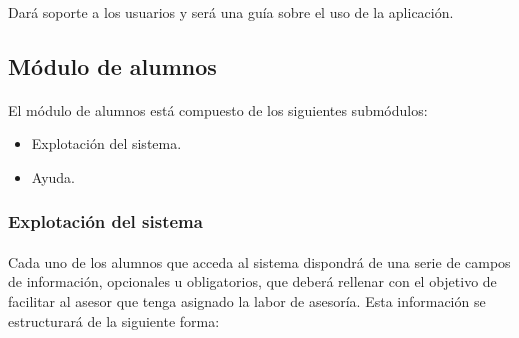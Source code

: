       \paragraph{}Dará soporte a los usuarios y será una guía sobre el uso de
      la aplicación.

   \subsection{Módulo de alumnos}\label{modAlumnos}

      \paragraph{}El módulo de alumnos está compuesto de los siguientes
      submódulos:

      \begin{itemize}
       \item Explotación del sistema.
       \item Ayuda.
      \end{itemize}

      \subsubsection{Explotación del sistema}

      \paragraph{}Cada uno de los alumnos que acceda al sistema dispondrá
      de una serie de campos de información, opcionales u obligatorios, que
      deberá rellenar con el objetivo de facilitar al asesor que tenga asignado
      la labor de asesoría. Esta información se estructurará de la siguiente
      forma:


